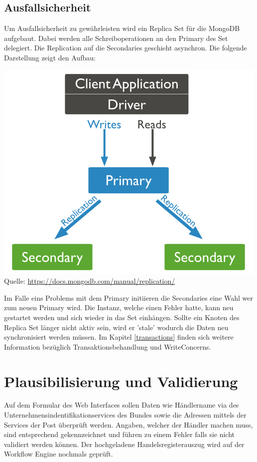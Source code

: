 \subsection{Ausfallsicherheit}

Um Ausfallsicherheit zu gewährleisten wird ein Replica Set für die MongoDB aufgebaut. Dabei werden alle Schreiboperationen an den Primary des Set delegiert. Die Replication auf die Secondaries geschieht asynchron. Die folgende Darstellung zeigt den Aufbau:
\begin{center}
	\includegraphics[scale=0.6]{mongodb-replicaset.png}\newline
	Quelle: \url{https://docs.mongodb.com/manual/replication/}
\end{center}
Im Falle eins Problems mit dem Primary initiieren die Secondaries eine Wahl wer zum neuen Primary wird. Die Instanz, welche einen Fehler hatte, kann neu gestartet werden und sich wieder in das Set einhängen. Sollte ein Knoten des Replica Set länger nicht aktiv sein, wird er 'stale' wodurch die Daten neu synchronisiert werden müssen. Im Kapitel \ref{transactions} finden sich weitere Information bezüglich Transaktionsbehandlung und WriteConcerns.

\section{Plausibilisierung und Validierung}

Auf dem Formular des Web Interfaces sollen Daten wie Händlername via des Unternehmensindentifikationservices des Bundes sowie die Adressen mittels der Services der Post überprüft werden. Angaben, welcher der Händler machen muss, sind entsprechend gekennzeichnet und führen zu einem Fehler falls sie nicht validiert werden können. Der hochgeladene Handelsregisterauszug wird auf der Workflow Engine nochmals geprüft.

